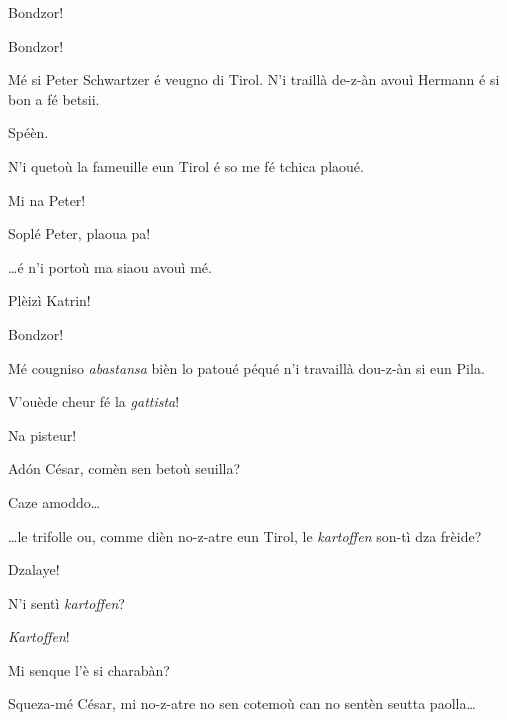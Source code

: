 \begin{drama}
\Peterspeaks{} Bondzor!

\Cesarspeaks Bondzor!

\Peterspeaks Mé si Peter Schwartzer é veugno di Tirol. N'i traillà de-z-àn avouì Hermann é si bon a fé betsii.

\Cesarspeaks Spéèn.

\Peterspeaks N'i quetoù la fameuille eun Tirol é so me fé tchica plaoué.


\Cesarspeaks Mi na Peter!


\Hermannspeaks Soplé Peter, plaoua pa!


\Peterspeaks  \ldots é n'i portoù ma siaou avouì mé.


\Katrinspeaks{} Plèizì Katrin!

\Cesarspeaks{} Bondzor!

\Katrinspeaks Mé cougniso \textit{abastansa} bièn lo patoué péqué n'i travaillà dou-z-àn si eun Pila.

\Cesarspeaks  V'ouède cheur fé la \textit{gattista}!

\Katrinspeaks Na pisteur!

\Hermannspeaks{} Ad\'on César, comèn sen betoù seu\-illa?

\Cesarspeaks Caze amoddo\ldots

\Hermannspeaks{} \ldots le trifolle ou, comme dièn no-z-atre eun Tirol, le \textit{kartoffen} son-tì dza frèide?

\Cesarspeaks Dzalaye!

\Katrinspeaks N'i sentì \textit{kartoffen}?

\Peterspeaks \textit{Kartoffen}!



\Cesarspeaks Mi senque l'è si charabàn?

\Hermannspeaks{} Squeza-mé César, mi no-z-atre no sen cotemoù can no sentèn seutta paolla\ldots


\end{drama}
